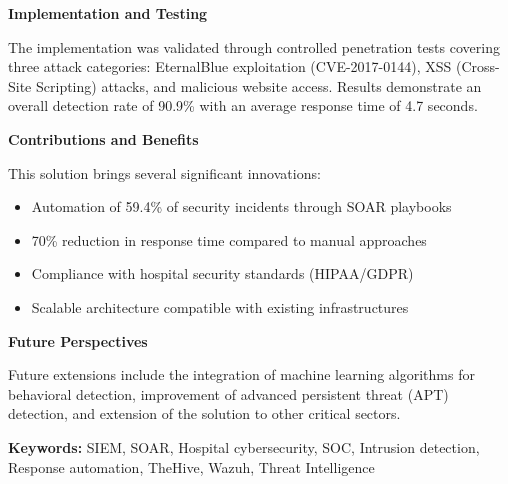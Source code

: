 \vspace{0.5cm}

\textbf{Implementation and Testing}

The implementation was validated through controlled penetration tests covering three attack categories: EternalBlue exploitation (CVE-2017-0144), XSS (Cross-Site Scripting) attacks, and malicious website access. Results demonstrate an overall detection rate of 90.9\% with an average response time of 4.7 seconds.

\vspace{0.5cm}

\textbf{Contributions and Benefits}

This solution brings several significant innovations:
\begin{itemize}
    \item Automation of 59.4\% of security incidents through SOAR playbooks
    \item 70\% reduction in response time compared to manual approaches
    \item Compliance with hospital security standards (HIPAA/GDPR)
    \item Scalable architecture compatible with existing infrastructures
\end{itemize}

\vspace{0.5cm}

\textbf{Future Perspectives}

Future extensions include the integration of machine learning algorithms for behavioral detection, improvement of advanced persistent threat (APT) detection, and extension of the solution to other critical sectors.

\vspace{1cm}

\textbf{Keywords:} SIEM, SOAR, Hospital cybersecurity, SOC, Intrusion detection, Response automation, TheHive, Wazuh, Threat Intelligence

\newpage
